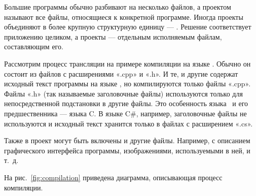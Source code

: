 Большие программы обычно разбивают на несколько файлов, а проектом
называют все файлы, относящиеся к конкретной программе.  Иногда
проекты объединяют в более крупную структурную единицу —
.  Решение соответствует приложению целиком, а
проекты — отдельным исполняемым файлам, составляющим его.

Рассмотрим процесс трансляции на примере компиляции
 на языке \CPP. Обычно он состоит из файлов с
расширениями «.cpp» и «.h».  И те, и другие содержат исходный текст
программы на языке \CPP, но компилируются только файлы «.cpp». Файлы
«.h» (так называемые заголовочные файлы) используются только для
непосредственной подстановки в другие файлы. Это особенность языка
\CPP\ и его предшественника — языка C.  В языке C\#, например,
заголовочные файлы не используются и исходный текст хранится только в
файлах с расширением «.cs».

Также в проект могут быть включены и другие файлы. Например, с
описанием графического интерфейса программы, изображениями,
используемыми в ней, и т.~д.


На рис.~\ref{fig:compilation} приведена диаграмма, описывающая процесс
компиляции.

